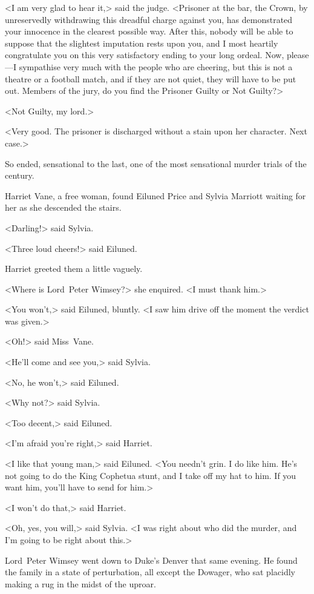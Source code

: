<I am very glad to hear it,> said the judge. <Prisoner at the bar, the Crown, by unreservedly withdrawing this dreadful charge against you, has demonstrated your innocence in the clearest possible way. After this, nobody will be able to suppose that the slightest imputation rests upon you, and I most heartily congratulate you on this very satisfactory ending to your long ordeal. Now, please—I sympathise very much with the people who are cheering, but this is not a theatre or a football match, and if they are not quiet, they will have to be put out. Members of the jury, do you find the Prisoner Guilty or Not Guilty?>

<Not Guilty, my lord.>

<Very good. The prisoner is discharged without a stain upon her character. Next case.>

So ended, sensational to the last, one of the most sensational murder trials of the century.

\divider

Harriet Vane, a free woman, found Eiluned Price and Sylvia Marriott waiting for her as she descended the stairs.

<Darling!> said Sylvia.

<Three loud cheers!> said Eiluned.

Harriet greeted them a little vaguely.

<Where is Lord~Peter Wimsey?> she enquired. <I must thank him.>

<You won't,> said Eiluned, bluntly. <I saw him drive off the moment the verdict was given.>

<Oh!> said Miss~Vane.

<He'll come and see you,> said Sylvia.

<No, he won't,> said Eiluned.

<Why not?> said Sylvia.

<Too decent,> said Eiluned.

<I'm afraid you're right,> said Harriet.

<I like that young man,> said Eiluned. <You needn't grin. I do like him. He's not going to do the King Cophetua stunt, and I take off my hat to him. If you want him, you'll have to send for him.>

<I won't do that,> said Harriet.

<Oh, yes, you will,> said Sylvia. <I was right about who did the murder, and I'm going to be right about this.>

\divider

Lord~Peter Wimsey went down to Duke's Denver that same evening. He found the family in a state of perturbation, all except the Dowager, who sat placidly making a rug in the midst of the uproar.

